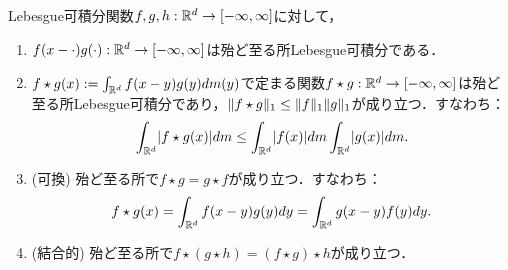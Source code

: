 \documentclass[uplatex, dvipdfmx]{jsreport}
\begin{document}
\begin{definition}[convolution]
    Lebesgue可積分関数$f,g,h:\mathbb{R}^d\to[-\infty,\infty]$に対して，
    \begin{enumerate}
        \item $f(x-\cdot)g(\cdot):\mathbb{R}^d\to[-\infty,\infty]$は殆ど至る所Lebesgue可積分である．
        \item $f\star g(x):=\int_{\mathbb{R}^d}f(x-y)g(y)dm(y)$で定まる関数$f\star g:\mathbb{R}^d\to[-\infty,\infty]$は殆ど至る所Lebesgue可積分であり，$\|f\star g\|_1\le\|f\|_1\|g\|_1$が成り立つ．すなわち：
        \[\int_{\mathbb{R}^d}\lvert f\star g(x)\rvert dm\le\int_{\mathbb{R}^d}\lvert f(x)\rvert dm\int_{\mathbb{R}^d}\lvert g(x)\rvert dm.\]
        \item (可換) 殆ど至る所で$f\star g=g\star f$が成り立つ．すなわち：
        \[f\star g(x)=\int_{\mathbb{R}^d}f(x-y)g(y)dy=\int_{\mathbb{R}^d}g(x-y)f(y)dy.\]
        \item (結合的) 殆ど至る所で$f\star (g\star h)=(f\star g)\star h$が成り立つ．
    \end{enumerate}
\end{definition}
\end{document}
